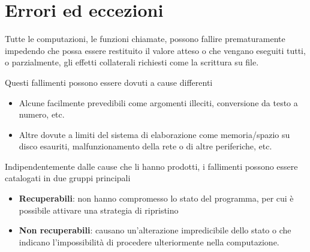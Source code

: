 
\section{Errori ed eccezioni}

Tutte le computazioni, le funzioni chiamate, possono fallire prematuramente
impedendo che possa essere restituito il valore atteso o che vengano eseguiti
tutti, o parzialmente, gli effetti collaterali richiesti come la scrittura su file.




Questi fallimenti possono essere dovuti a cause differenti

\begin{itemize}
  \item Alcune facilmente prevedibili come argomenti illeciti,
        conversione da testo a numero, etc.
  \item Altre dovute a limiti del sistema di elaborazione come memoria/spazio
        su disco esauriti, malfunzionamento della rete o di altre periferiche, etc.
\end{itemize}




Indipendentemente dalle cause che li hanno prodotti, i fallimenti possono essere
catalogati in due gruppi principali


\begin{itemize}
  \item \textbf{Recuperabili}: non hanno compromesso lo stato del
        programma, per cui è possibile attivare una strategia di ripristino
  \item \textbf{Non recuperabili}: causano un'alterazione
        impredicibile dello stato o che indicano l'impossibilità di procedere
        ulteriormente nella computazione.
\end{itemize}

